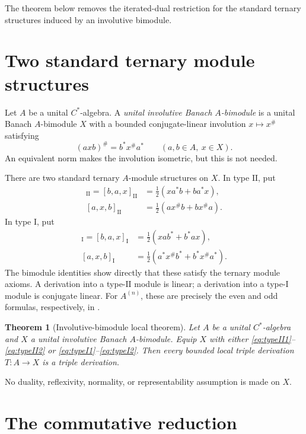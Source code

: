\documentclass[11pt]{article}
\newtheorem{theorem}{Theorem}
\newcommand{\I}{\mathrm I}
\newcommand{\II}{\mathrm{II}}
\begin{document}
The theorem below removes the iterated-dual restriction for the standard
ternary structures induced by an involutive bimodule.

\section{Two standard ternary module structures}

Let $A$ be a unital $C^*$-algebra.  A \emph{unital involutive Banach
$A$-bimodule} is a unital Banach $A$-bimodule $X$ with a bounded
conjugate-linear involution $x\mapsto x^\#$ satisfying
\[
 (a x b)^\#=b^*x^\#a^* \qquad(a,b\in A,\ x\in X).
\]
An equivalent norm makes the involution isometric, but this is not needed.

There are two standard ternary $A$-module structures on $X$.  In type
$\II$, put
\begin{align}
 [x,a,b]_{\II}=[b,a,x]_{\II}
   &=\tfrac12(xa^*b+ba^*x), \label{eq:typeII1}\\
 [a,x,b]_{\II}&=\tfrac12(ax^\#b+bx^\#a). \label{eq:typeII2}
\end{align}
In type $\I$, put
\begin{align}
 [x,a,b]_{\I}=[b,a,x]_{\I}
   &=\tfrac12(xab^*+b^*ax), \label{eq:typeI1}\\
 [a,x,b]_{\I}&=\tfrac12(a^*x^\#b^*+b^*x^\#a^*). \label{eq:typeI2}
\end{align}
The bimodule identities show directly that these satisfy the ternary module
axioms.  A derivation into a type-$\II$ module is linear; a derivation into a
type-$\I$ module is conjugate linear.  For $A^{(n)}$, these are precisely the
even and odd formulas, respectively, in \cite[Proposition 2.4]{NM}.

\begin{theorem}[Involutive-bimodule local theorem]
\label{thm:main}
Let $A$ be a unital $C^*$-algebra and $X$ a unital involutive Banach
$A$-bimodule.  Equip $X$ with either \eqref{eq:typeII1}--\eqref{eq:typeII2}
or \eqref{eq:typeI1}--\eqref{eq:typeI2}.  Then every bounded local triple
derivation $T:A\to X$ is a triple derivation.
\end{theorem}

No duality, reflexivity, normality, or representability assumption is made
on $X$.

\section{The commutative reduction}
\end{document}
